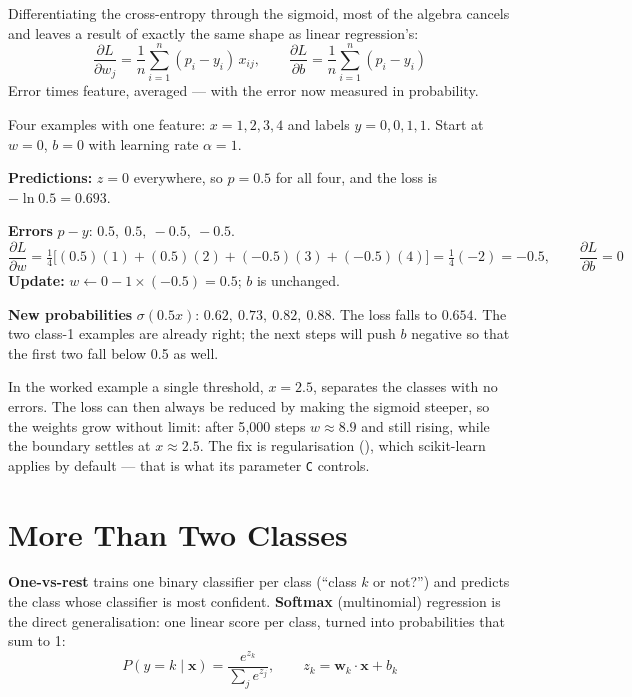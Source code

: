 Differentiating the cross-entropy through the sigmoid, most of the algebra
cancels and leaves a result of exactly the same shape as linear regression's:
\[
\frac{\partial L}{\partial w_j} = \frac{1}{n}\sum_{i=1}^{n}(p_i - y_i)\,x_{ij},
\qquad
\frac{\partial L}{\partial b} = \frac{1}{n}\sum_{i=1}^{n}(p_i - y_i)
\]
Error times feature, averaged --- with the error now measured in probability.

\begin{worked}
Four examples with one feature: $x = 1, 2, 3, 4$ and labels $y = 0, 0, 1, 1$. Start at
$w = 0$, $b = 0$ with learning rate $\alpha = 1$.

\smallskip
\textbf{Predictions:} $z = 0$ everywhere, so $p = 0.5$ for all four, and the loss is
$-\ln 0.5 = 0.693$.

\textbf{Errors} $p - y$: $0.5,\ 0.5,\ -0.5,\ -0.5$.
\[
\frac{\partial L}{\partial w} = \tfrac{1}{4}\big[(0.5)(1) + (0.5)(2) + (-0.5)(3) + (-0.5)(4)\big]
= \tfrac{1}{4}(-2) = -0.5,
\qquad \frac{\partial L}{\partial b} = 0
\]
\textbf{Update:} $w \leftarrow 0 - 1 \times (-0.5) = 0.5$; $b$ is unchanged.

\textbf{New probabilities} $\sigma(0.5x)$: $0.62,\ 0.73,\ 0.82,\ 0.88$. The loss falls to
$0.654$. The two class-1 examples are already right; the next steps will push $b$
negative so that the first two fall below 0.5 as well.
\end{worked}

\begin{alertbox}
In the worked example a single threshold, $x = 2.5$, separates the classes with no
errors. The loss can then always be reduced by making the sigmoid steeper, so the
weights grow without limit: after 5{,}000 steps $w \approx 8.9$ and still rising,
while the boundary settles at $x \approx 2.5$. The fix is regularisation
(), which scikit-learn applies by default --- that is what
its parameter \texttt{C} controls.
\end{alertbox}

\section{More Than Two Classes}

\textbf{One-vs-rest} trains one binary classifier per class (``class $k$ or not?'')
and predicts the class whose classifier is most confident. \textbf{Softmax}
(multinomial) regression is the direct generalisation: one linear score per class,
turned into probabilities that sum to 1:
\[
P(y = k \mid \mathbf{x}) = \frac{e^{z_k}}{\sum_{j} e^{z_j}},
\qquad z_k = \mathbf{w}_k\cdot\mathbf{x} + b_k
\]

